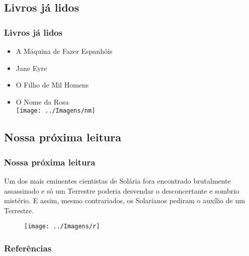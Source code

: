 \documentclass{beamer}
\begin{document}
\begin{frame}
	\section{Livros já lidos}
	\frametitle{\bfseries{Livros já lidos}}
	\begin{itemize}
		\item[{\textcolor{red!90!black}{\ding{111}}}]{A Máquina de Fazer Espanhóis}
		\item[{\textcolor{red!90!black}{\ding{111}}}]{Jane Eyre}
		\item[{\textcolor{red!90!black}{\ding{111}}}]{O Filho de Mil Homens}
		\item[{\textcolor{red!90!black}{\ding{111}}}]{O Nome da Rosa} \\

		\texttt{[image: ../Imagens/nm]}
	\end{itemize}
\end{frame}

\begin{frame}
		\section{Nossa próxima leitura}
	  	\frametitle{\bfseries{Nossa próxima leitura}}
		\begin{tcolorbox}[colback=red!5!white, colframe=red!65!black,
			title={\sc{\bf{Os Robôs}}}]
		\begin{minipage}{.5\linewidth}
			Um dos mais eminentes cientistas de Solária
			fora encontrado brutalmente assassinado e  só um Terrestre poderia desvendar o desconcertante  e sombrio mistério. E assim, mesmo contrariados,  os Solarianos pediram o auxílio de um Terrestre.
			\cite{Is}
		\end{minipage}
		\begin{minipage}{0.5\linewidth}
		\begin{figure}
			\texttt{[image: ../Imagens/r]}
		\end{figure}
		\end{minipage}
		\end{tcolorbox}
\end{frame}

\begin{frame}
\frametitle{\bfseries{Referências}}

\end{frame}
\end{document}
